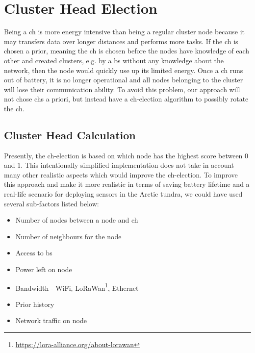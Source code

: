 \documentclass[USenglish]{uit-thesis}
\begin{document}
\newpage

\section{Cluster Head Election} \label{disc:ch_election}
Being a \gls{ch} is more energy intensive than being a regular cluster node because it may transfers data over longer distances and performs more tasks. If the \gls{ch} is chosen a prior, meaning the \gls{ch} is chosen before the nodes have knowledge of each other and created clusters, e.g. by a \gls{bs} without any knowledge about the network, then the node would quickly use up its limited energy. Once a \gls{ch} runs out of battery, it is no longer operational and all nodes belonging to the cluster will lose their communication ability. To avoid this problem, our approach will not chose \glspl{ch} a priori, but instead have a \gls{ch}-election algorithm to possibly rotate the \gls{ch}.




\subsection{Cluster Head Calculation} \label{ssec:ch_election}
Presently, the \gls{ch}-election is based on which node has the highest score between $0$ and 1. This intentionally simplified implementation does not take in account many other realistic aspects which would improve the \gls{ch}-election. To improve this approach and make it more realistic in terms of saving battery lifetime and a real-life scenario for deploying sensors in the Arctic tundra, we could have used several sub-factors listed below:

\begin{itemize}
\item Number of nodes between a node and \gls{ch}
\item Number of neighbours for the node
\item Access to \gls{bs}
\item Power left on node
\item Bandwidth - WiFi, LoRaWan\footnote{\url{https://lora-alliance.org/about-lorawan}}, Ethernet
\item Prior history
\item Network traffic on node
\end{itemize}
\end{document}
